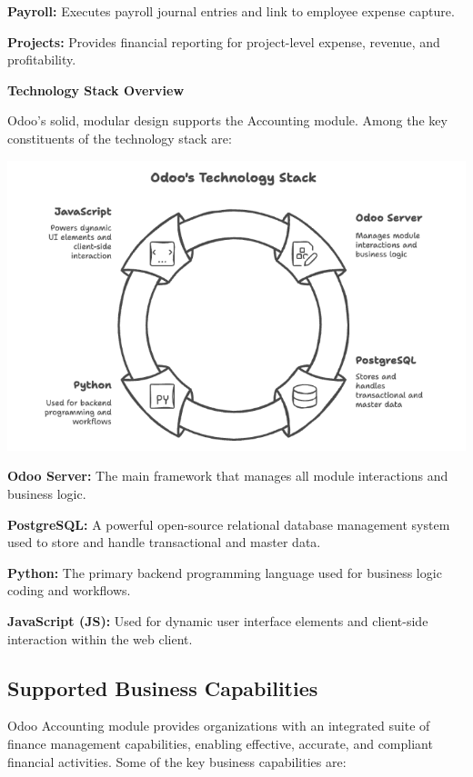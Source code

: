 \documentclass[11pt,a4paper]{article}
\begin{document}
\noindent\textbf{Payroll:} Executes payroll journal entries and link to employee expense capture.

\noindent\textbf{Projects:} Provides financial reporting for project-level expense, revenue, and profitability.
\bigskip

\noindent\textbf{Technology Stack Overview}

\noindent Odoo's solid, modular design supports the Accounting module. Among the key constituents of the technology stack are:

\begin{center}
    \includegraphics[width=0.8\linewidth]{diagram/odoo_technology_stack.png}
\end{center}

\noindent\textbf{Odoo Server:} The main framework that manages all module interactions and business logic.

\noindent\textbf{PostgreSQL:} A powerful open-source relational database management system used to store and handle transactional and master data.

\noindent\textbf{Python:} The primary backend programming language used for business logic coding and workflows.

\noindent\textbf{JavaScript (JS):} Used for dynamic user interface elements and client-side interaction within the web client.

\subsection{Supported Business Capabilities}
Odoo Accounting module provides organizations with an integrated suite of finance management capabilities, enabling effective, accurate, and compliant financial activities. Some of the key business capabilities are:
\end{document}
